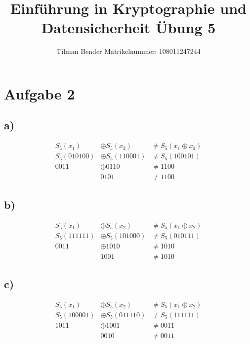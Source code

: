 \documentclass[10pt,a4paper]{article}
\author{Tilman Bender   Matrikelnummer: 108011247244\\}
\title{Einführung in Kryptographie und Datensicherheit Übung 5}
\begin{document}
\maketitle

\section*{Aufgabe 2}
\subsection*{a)}
\begin{align*} 
S_{5}(x_{1}) &\oplus S_{5}(x_{2}) &\neq S_{5}(x_{1} \oplus x_{2}) \\
S_{5}(010100) &\oplus S_{5}(110001) &\neq S_{5}(100101)\\
0011 &\oplus 0110 &\neq 1100\\
& 0101 &\neq 1100
\end{align*}

\subsection*{b)}
\begin{align*} 
S_{5}(x_{1}) &\oplus S_{5}(x_{2}) &\neq S_{5}(x_{1} \oplus x_{2}) \\
S_{5}(111111) &\oplus S_{5}(101000) &\neq S_{5}(010111)\\
0011 &\oplus 1010 &\neq 1010\\
& 1001 &\neq 1010
\end{align*}

\subsection*{c)}
\begin{align*} 
S_{5}(x_{1}) &\oplus S_{5}(x_{2}) &\neq S_{5}(x_{1} \oplus x_{2}) \\
S_{5}(100001) &\oplus S_{5}(011110) &\neq S_{5}(111111)\\
1011 &\oplus 1001 &\neq 0011\\
& 0010 &\neq 0011
\end{align*}
\end{document}
